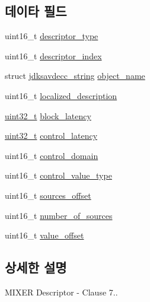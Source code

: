 \subsection*{데이타 필드}
\begin{DoxyCompactItemize}
\item 
uint16\+\_\+t \hyperlink{structjdksavdecc__descriptor__mixer_ab7c32b6c7131c13d4ea3b7ee2f09b78d}{descriptor\+\_\+type}
\item 
uint16\+\_\+t \hyperlink{structjdksavdecc__descriptor__mixer_a042bbc76d835b82d27c1932431ee38d4}{descriptor\+\_\+index}
\item 
struct \hyperlink{structjdksavdecc__string}{jdksavdecc\+\_\+string} \hyperlink{structjdksavdecc__descriptor__mixer_a7d1f5945a13863b1762fc6db74fa8f80}{object\+\_\+name}
\item 
uint16\+\_\+t \hyperlink{structjdksavdecc__descriptor__mixer_a0926f846ca65a83ad5bb06b4aff8f408}{localized\+\_\+description}
\item 
\hyperlink{parse_8c_a6eb1e68cc391dd753bc8ce896dbb8315}{uint32\+\_\+t} \hyperlink{structjdksavdecc__descriptor__mixer_ae2e9f0088d5e900b610d1b2818dfc559}{block\+\_\+latency}
\item 
\hyperlink{parse_8c_a6eb1e68cc391dd753bc8ce896dbb8315}{uint32\+\_\+t} \hyperlink{structjdksavdecc__descriptor__mixer_ab2bd4639caaf9a8078b68368afbd63b6}{control\+\_\+latency}
\item 
uint16\+\_\+t \hyperlink{structjdksavdecc__descriptor__mixer_a8937b22996b7c28ae209f29fe777f03a}{control\+\_\+domain}
\item 
uint16\+\_\+t \hyperlink{structjdksavdecc__descriptor__mixer_a62a5b88a920cc4d09508de6fc60d9a63}{control\+\_\+value\+\_\+type}
\item 
uint16\+\_\+t \hyperlink{structjdksavdecc__descriptor__mixer_ac9ce4e1b642e6654d49504898dbe738d}{sources\+\_\+offset}
\item 
uint16\+\_\+t \hyperlink{structjdksavdecc__descriptor__mixer_a1af3a7f3729937d5da218737ba5b2483}{number\+\_\+of\+\_\+sources}
\item 
uint16\+\_\+t \hyperlink{structjdksavdecc__descriptor__mixer_a67b64485005415f9a58a25736aa8def1}{value\+\_\+offset}
\end{DoxyCompactItemize}


\subsection{상세한 설명}
M\+I\+X\+ER Descriptor -\/ Clause 7.. 

